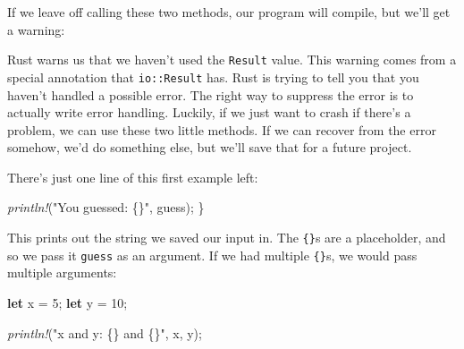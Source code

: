 \documentclass[a4paper,]{book}
\newenvironment{Shaded}{\begin{snugshade}}{\end{snugshade}}
\newcommand{\KeywordTok}[1]{\textcolor[rgb]{0.13,0.29,0.53}{\textbf{{#1}}}}
\newcommand{\DecValTok}[1]{\textcolor[rgb]{0.00,0.00,0.81}{{#1}}}
\newcommand{\StringTok}[1]{\textcolor[rgb]{0.31,0.60,0.02}{{#1}}}
\newcommand{\CommentTok}[1]{\textcolor[rgb]{0.56,0.35,0.01}{\textit{{#1}}}}
\newcommand{\PreprocessorTok}[1]{\textcolor[rgb]{0.56,0.35,0.01}{\textit{{#1}}}}
\newcommand{\NormalTok}[1]{{#1}}
\begin{document}
If we leave off calling these two methods, our program will compile, but
we'll get a warning:

\begin{Shaded}
\end{Shaded}

Rust warns us that we haven't used the \texttt{Result} value. This
warning comes from a special annotation that \texttt{io::Result} has.
Rust is trying to tell you that you haven't handled a possible error.
The right way to suppress the error is to actually write error handling.
Luckily, if we just want to crash if there's a problem, we can use these
two little methods. If we can recover from the error somehow, we'd do
something else, but we'll save that for a future project.

There's just one line of this first example left:

\begin{Shaded}
\begin{Highlighting}[]
    \PreprocessorTok{println!}\NormalTok{(}\StringTok{"You guessed: \{\}"}\NormalTok{, guess);}
\NormalTok{\}}
\end{Highlighting}
\end{Shaded}

This prints out the string we saved our input in. The \texttt{\{\}}s are
a placeholder, and so we pass it \texttt{guess} as an argument. If we
had multiple \texttt{\{\}}s, we would pass multiple arguments:

\begin{Shaded}
\begin{Highlighting}[]
\KeywordTok{let} \NormalTok{x = }\DecValTok{5}\NormalTok{;}
\KeywordTok{let} \NormalTok{y = }\DecValTok{10}\NormalTok{;}

\PreprocessorTok{println!}\NormalTok{(}\StringTok{"x and y: \{\} and \{\}"}\NormalTok{, x, y);}
\end{Highlighting}
\end{Shaded}
\end{document}
